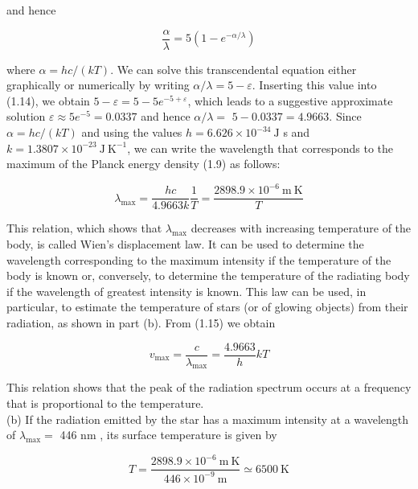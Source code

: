 \documentclass[10pt]{article}
\begin{document}
and hence


\begin{equation*}
\frac{\alpha}{\lambda}=5\left(1-e^{-\alpha / \lambda}\right) \tag{1.14}
\end{equation*}


where $\alpha=h c /(k T)$. We can solve this transcendental equation either graphically or numerically by writing $\alpha / \lambda=5-\varepsilon$. Inserting this value into (1.14), we obtain $5-\varepsilon=5-5 e^{-5+\varepsilon}$, which leads to a suggestive approximate solution $\varepsilon \approx 5 e^{-5}=0.0337$ and hence $\alpha / \lambda=$ $5-0.0337=4.9663$. Since $\alpha=h c /(k T)$ and using the values $h=6.626 \times 10^{-34} \mathrm{~J}$ s and $k=1.3807 \times 10^{-23} \mathrm{~J} \mathrm{~K}^{-1}$, we can write the wavelength that corresponds to the maximum of the Planck energy density (1.9) as follows:


\begin{equation*}
\lambda_{\max }=\frac{h c}{4.9663 k} \frac{1}{T}=\frac{2898.9 \times 10^{-6} \mathrm{~m} \mathrm{~K}}{T} \tag{1.15}
\end{equation*}


This relation, which shows that $\lambda_{\max }$ decreases with increasing temperature of the body, is called Wien's displacement law. It can be used to determine the wavelength corresponding to the maximum intensity if the temperature of the body is known or, conversely, to determine the temperature of the radiating body if the wavelength of greatest intensity is known. This law can be used, in particular, to estimate the temperature of stars (or of glowing objects) from their radiation, as shown in part (b). From (1.15) we obtain


\begin{equation*}
v_{\max }=\frac{c}{\lambda_{\max }}=\frac{4.9663}{h} k T \tag{1.16}
\end{equation*}


This relation shows that the peak of the radiation spectrum occurs at a frequency that is proportional to the temperature.\\
(b) If the radiation emitted by the star has a maximum intensity at a wavelength of $\lambda_{\max }=$ 446 nm , its surface temperature is given by


\begin{equation*}
T=\frac{2898.9 \times 10^{-6} \mathrm{~m} \mathrm{~K}}{446 \times 10^{-9} \mathrm{~m}} \simeq 6500 \mathrm{~K} \tag{1.17}
\end{equation*}
\end{document}
